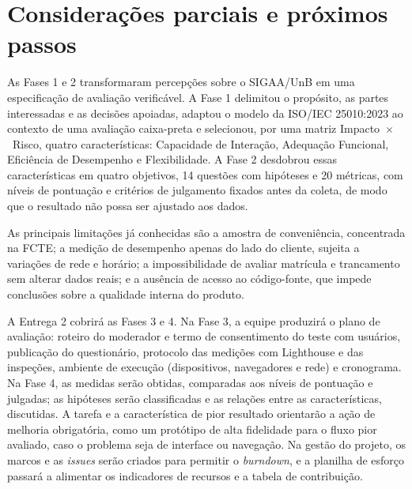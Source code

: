 \chapter{Considerações parciais e próximos passos}
\label{cap:consideracoes}

As Fases 1 e 2 transformaram percepções sobre o SIGAA/UnB em uma especificação de avaliação verificável. A Fase 1 delimitou o propósito, as partes interessadas e as decisões apoiadas, adaptou o modelo da ISO/IEC 25010:2023 ao contexto de uma avaliação caixa-preta e selecionou, por uma matriz Impacto~$\times$~Risco, quatro características: Capacidade de Interação, Adequação Funcional, Eficiência de Desempenho e Flexibilidade. A Fase 2 desdobrou essas características em quatro objetivos, 14 questões com hipóteses e 20 métricas, com níveis de pontuação e critérios de julgamento fixados antes da coleta, de modo que o resultado não possa ser ajustado aos dados.

As principais limitações já conhecidas são a amostra de conveniência, concentrada na FCTE; a medição de desempenho apenas do lado do cliente, sujeita a variações de rede e horário; a impossibilidade de avaliar matrícula e trancamento sem alterar dados reais; e a ausência de acesso ao código-fonte, que impede conclusões sobre a qualidade interna do produto.

A Entrega 2 cobrirá as Fases 3 e 4. Na Fase 3, a equipe produzirá o plano de avaliação: roteiro do moderador e termo de consentimento do teste com usuários, publicação do questionário, protocolo das medições com Lighthouse e das inspeções, ambiente de execução (dispositivos, navegadores e rede) e cronograma. Na Fase 4, as medidas serão obtidas, comparadas aos níveis de pontuação e julgadas; as hipóteses serão classificadas e as relações entre as características, discutidas. A tarefa e a característica de pior resultado orientarão a ação de melhoria obrigatória, como um protótipo de alta fidelidade para o fluxo pior avaliado, caso o problema seja de interface ou navegação. Na gestão do projeto, os marcos e as \textit{issues} serão criados para permitir o \textit{burndown}, e a planilha de esforço passará a alimentar os indicadores de recursos e a tabela de contribuição.

